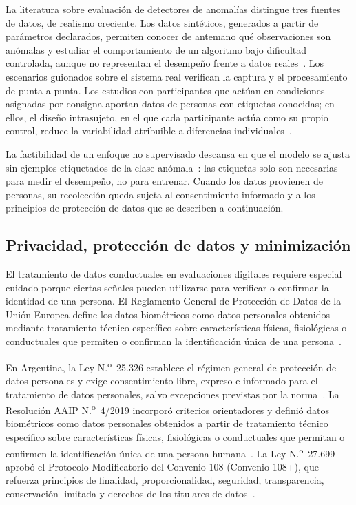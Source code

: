 La literatura sobre evaluación de detectores de anomalías distingue tres fuentes de datos, de realismo creciente. Los datos sintéticos, generados a partir de parámetros declarados, permiten conocer de antemano qué observaciones son anómalas y estudiar el comportamiento de un algoritmo bajo dificultad controlada, aunque no representan el desempeño frente a datos reales~\parencite{Emmott2013, Goldstein2016}. Los escenarios guionados sobre el sistema real verifican la captura y el procesamiento de punta a punta. Los estudios con participantes que actúan en condiciones asignadas por consigna aportan datos de personas con etiquetas conocidas; en ellos, el diseño intrasujeto, en el que cada participante actúa como su propio control, reduce la variabilidad atribuible a diferencias individuales~\parencite{Charness2012}.

La factibilidad de un enfoque no supervisado descansa en que el modelo se ajusta sin ejemplos etiquetados de la clase anómala~\parencite{Chandola2009, Liu2008}: las etiquetas solo son necesarias para medir el desempeño, no para entrenar. Cuando los datos provienen de personas, su recolección queda sujeta al consentimiento informado y a los principios de protección de datos que se describen a continuación.

\subsection{Privacidad, protección de datos y minimización}
\label{sec:privacidad}

El tratamiento de datos conductuales en evaluaciones digitales requiere especial cuidado porque ciertas señales pueden utilizarse para verificar o confirmar la identidad de una persona. El Reglamento General de Protección de Datos de la Unión Europea define los datos biométricos como datos personales obtenidos mediante tratamiento técnico específico sobre características físicas, fisiológicas o conductuales que permiten o confirman la identificación única de una persona~\parencite{GDPR2016}.

En Argentina, la Ley N.\textsuperscript{o}~25.326 establece el régimen general de protección de datos personales y exige consentimiento libre, expreso e informado para el tratamiento de datos personales, salvo excepciones previstas por la norma~\parencite{Argentina2000Ley25326}. La Resolución AAIP N.\textsuperscript{o}~4/2019 incorporó criterios orientadores y definió datos biométricos como datos personales obtenidos a partir de tratamiento técnico específico sobre características físicas, fisiológicas o conductuales que permitan o confirmen la identificación única de una persona humana~\parencite{AAIP2019Res4}. La Ley N.\textsuperscript{o}~27.699 aprobó el Protocolo Modificatorio del Convenio 108 (Convenio 108+), que refuerza principios de finalidad, proporcionalidad, seguridad, transparencia, conservación limitada y derechos de los titulares de datos~\parencite{Argentina2022Ley27699}.

